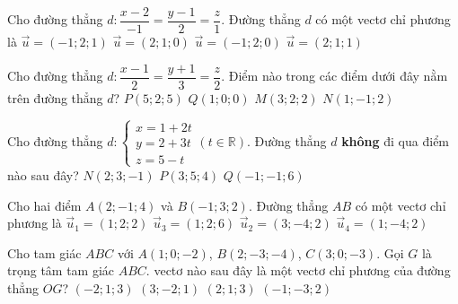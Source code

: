 \begin{ex}
	Cho đường thẳng $d\colon \dfrac{x-2}{-1}=\dfrac{y-1}{2}=\dfrac{z}{1}$. Đường thẳng $d$ có một vectơ chỉ phương là
	\choice
	{\True $\vec{u}=(-1;2;1)$}
	{ $\vec{u}=(2;1;0)$}
	{ $\vec{u}=(-1;2;0)$}
	{ $\vec{u}=(2;1;1)$}
\end{ex}

\begin{ex}
	Cho đường thẳng $d: \dfrac{x-1}{2}=\dfrac{y+1}{3}=\dfrac{z}{2}$. Điểm nào trong các điểm dưới đây nằm trên đường thẳng $d$?
	\choice
	{$P(5;2;5)$}
	{$Q(1;0;0)$}
	{\True $M(3;2;2)$}
	{$N(1;-1;2)$}
	\loigiai{
	}
\end{ex}

\begin{ex}
	Cho đường thẳng $d: \begin{cases}
		x=1+2t \\
		y=2+3t \\
		z=5-t
	\end{cases}(t\in \mathbb{R})$. Đường thẳng $d$ \textbf{không} đi qua điểm nào sau đây?
	{\True $N(2;3;-1)$}
	{$P(3;5;4)$}
	{$Q(-1;-1;6)$} 
	\loigiai{
	}
\end{ex}

\begin{ex}%
	Cho hai điểm $A(2;-1;4)$ và $B(-1;3;2)$. Đường thẳng $AB$ có một vectơ chỉ phương là
	\choice
	{$\overrightarrow{u}_1=(1;2;2)$}
	{$\overrightarrow{u}_3=(1;2;6)$}
	{\True $\overrightarrow{u}_2=(3;-4;2)$}
	{$\overrightarrow{u}_4=(1;-4;2)$}
\end{ex}

\begin{ex}%
	Cho tam giác $ABC$ với $A(1;0;-2)$, $B(2;-3;-4)$, $C(3;0;-3)$. Gọi $G$ là trọng tâm tam giác $ABC$. vectơ nào sau đây là một vectơ chỉ phương của đường thẳng $OG$?
	\choice
	{\True $(-2;1;3)$}
	{$(3;-2;1)$}
	{$(2;1;3)$}
	{$(-1;-3;2)$}
\end{ex}

